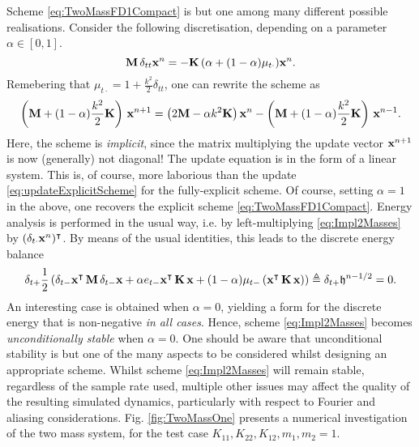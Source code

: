\documentclass[11pt,twoside,a4paper,english]{book}
\newcommand{\etm}{e_{t-}}
\newcommand{\dtp}{\delta_{t+}}
\newcommand{\dtm}{\delta_{t-}}
\newcommand{\dtd}{\delta_{t\cdot}}
\newcommand{\dtt}{\delta_{tt}}
\newcommand{\mtm}{\mu_{t-}}
\newcommand{\mtd}{\mu_{t\cdot}}
\begin{document}
Scheme \eqref{eq:TwoMassFD1Compact}  is but one among many different possible realisations. Consider the following discretisation, depending on a parameter $\alpha \in [0,1]$.
\begin{equation}\label{eq:Impl2Masses}
{\bf M}\, \dtt {\bf x}^n = - {\bf K}\, (\alpha + (1-\alpha)\mtd) {\bf x}^n.
\end{equation}
Remebering that $\mtd = 1 + \frac{k^2}{2}\dtt$, one can rewrite the scheme as 
\begin{equation}
\left({\bf M} + (1-\alpha)\frac{k^2}{2}{\bf K} \right) \, {\bf x}^{n+1} = \left(2 {\bf M} - \alpha k^2 {\bf K} \right){\bf x}^n - \left({\bf M} + (1-\alpha)\frac{k^2}{2}{\bf K} \right) \, {\bf x}^{n-1}.
\end{equation}
Here, the scheme is \emph{implicit}, since the matrix multiplying the update vector ${\bf x}^{n+1}$ is now (generally) not diagonal! The update equation is in the form of a linear system. This is, of course, more laborious than the update \eqref{eq:updateExplicitScheme} for the fully-explicit scheme. Of course, setting $\alpha = 1$ in the above, one recovers the explicit scheme \eqref{eq:TwoMassFD1Compact}.
Energy analysis is performed in the usual way, i.e. by left-multiplying \eqref{eq:Impl2Masses} by $(\dtd {\bf x}^n)^\intercal$. By means of the usual identities, this leads to the discrete energy balance
\begin{equation}
 \dtp \frac{1}{2}\left( \dtm {\bf x}^{\intercal}\,{\bf M}\, \dtm {\bf x} + \alpha \etm {\bf x}^{\intercal}\,{\bf K}\,  {\bf x} + (1-\alpha) \mtm \left({\bf x}^{\intercal}\,{\bf K}\,  {\bf x}\right) \right) \triangleq  \dtp {\mathfrak h}^{n-1/2}  = 0.
\end{equation}
An interesting case is obtained when $\alpha =0$, yielding a form for the discrete energy that is non-negative \emph{in all cases}.
Hence, scheme \eqref{eq:Impl2Masses} becomes \emph{unconditionally stable} when $\alpha = 0$. One should be aware that unconditional stability is but one of the many aspects to be considered whilst designing an appropriate scheme. Whilst scheme \eqref{eq:Impl2Masses} will remain stable, regardless of the sample rate used, multiple other issues may affect the quality of the resulting simulated dynamics, particularly with respect to Fourier and aliasing considerations. Fig. \ref{fig:TwoMassOne} presents a numerical investigation of the two mass system, for the test case $K_{11},K_{22},K_{12},m_1,m_2=1$. 
\end{document}
